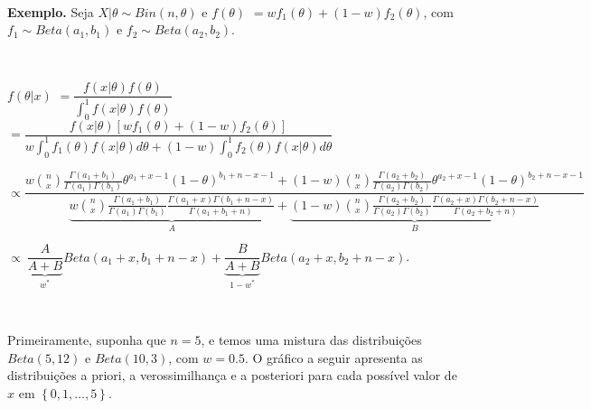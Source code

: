 \documentclass[
]{book}
\begin{document}
\(~\)

\textbf{Exemplo.} Seja \(X|\theta \sim Bin(n,\theta)\) e \(f(\theta)\) \(=wf_1(\theta)+(1-w)f_2(\theta)\), com \(f_1\sim Beta(a_1,b_1)\) e \(f_2\sim Beta(a_2,b_2)\).

\(~\)

\(f(\theta|x)\) \(=\dfrac{f(x|\theta)f(\theta)}{\int_0^1f(x|\theta)f(\theta)}\) \(=\dfrac{f(x|\theta)[wf_1(\theta)+(1-w)f_2(\theta)]}{w\int_0^1f_1(\theta)f(x|\theta)d\theta+(1-w)\int_0^1f_2(\theta)f(x|\theta)d\theta}\)

\(\propto\dfrac{w\binom{n}{x}\frac{\Gamma(a_1+b_1)}{\Gamma(a_1)\Gamma(b_1)}\theta^{a_1+x-1}(1-\theta)^{b_1+n-x-1}+(1-w)\binom{n}{x}\frac{\Gamma(a_2+b_2)}{\Gamma(a_2)\Gamma(b_2)}\theta^{a_2+x-1}(1-\theta)^{b_2+n-x-1}}{\underbrace{w\binom{n}{x}\frac{\Gamma(a_1+b_1)}{\Gamma(a_1)\Gamma(b_1)}\frac{\Gamma(a_1+x)\Gamma(b_1+n-x)}{\Gamma(a_1+b_1+n)}}_{A}+\underbrace{(1-w)\binom{n}{x}\frac{\Gamma(a_2+b_2)}{\Gamma(a_2)\Gamma(b_2)}\frac{\Gamma(a_2+x)\Gamma(b_2+n-x)}{\Gamma(a_2+b_2+n)}}_{B}}\)

\(\propto~\underbrace{\dfrac{A}{A+B}}_{w^*}Beta(a_1+x,b_1+n-x)+\underbrace{\dfrac{B}{A+B}}_{1-w^*}Beta(a_2+x,b_2+n-x)\).

\(~\)

Primeiramente, suponha que \(n=5\), e temos uma mistura das distribuições \(Beta(5,12)\) e \(Beta(10,3)\), com \(w=0.5\). O gráfico a seguir apresenta as distribuições a priori, a verossimilhança e a posteriori para cada possível valor de \(x\) em \(\left\{0,1,\ldots,5\right\}\).
\end{document}
